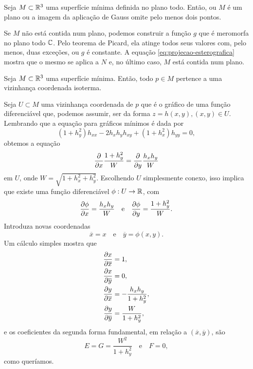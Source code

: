 \begin{corolario}
	Seja $M \subset \mathbb{R}^3$ uma superfície mínima definida no plano todo. Então, ou $M$ é um plano ou a imagem da aplicação de Gauss omite pelo menos dois pontos.
\end{corolario}

\begin{demonstracao}
	Se $M$ não está contida num plano, podemos construir a função $g$ que é meromorfa no plano todo $\mathbb{C}$. Pelo teorema de Picard, ela atinge todos seus valores com, pelo menos, duas exceções, ou $g$ é constante. A equação \eqref{eq:projecao-esterografica} mostra que o mesmo se aplica a $N$ e, no último caso, $M$ está contida num plano.
\end{demonstracao}

\begin{teorema}
	Seja $M \subset \mathbb{R}^3$ uma superfície mínima. Então, todo $p \in M$ pertence a uma vizinhança coordenada isoterma.
\end{teorema}

\begin{demonstracao}
	Seja $U \subset M$ uma vizinhança coordenada de $p$ que é o gráfico de uma função diferenciável que, podemos assumir, ser da forma $z = h(x,y), (x,y) \in U$.
	Lembrando que a equação para gráficos mínimos é dada por
	\begin{equation*}
	(1 + h_y^2) h_{xx} - 2 h_x h_y h_{xy} + (1 + h_x^2) h_{yy} = 0,
	\end{equation*}
	obtemos a equação
	\begin{equation*}
	\frac{\partial}{\partial x} \frac{1 + h_y^2}{W} = \frac{\partial}{\partial y} \frac{h_x h_y}{W}
	\end{equation*}
	em $U$, onde $W = \sqrt{1 + h_x^2 + h_y^2}$. Escolhendo $U$ simplesmente conexo, isso implica que existe uma função diferenciável $\phi: U \rightarrow \mathbb{R}$, com
	\begin{equation*}
	\frac{\partial \phi}{\partial x} = \frac{h_x h_y}{W} \quad \text{e} \quad
	\frac{\partial \phi}{\partial y} = \frac{1 + h_y^2}{W}.
	\end{equation*}
	Introduza novas coordenadas
	\begin{equation*}
	\overline{x} = x \quad \text{e} \quad
	\overline{y} = \phi(x,y).
	\end{equation*}
	Um cálculo simples mostra que
	\begin{align*}
	\frac{\partial x}{\partial \overline{x}} &= 1, \\
	\frac{\partial x}{\partial \overline{y}} &= 0, \\
	\frac{\partial y}{\partial \overline{x}} &= -\frac{h_x h_y}{1 + h_y^2}, \\
	\frac{\partial y}{\partial \overline{y}} &= \frac{W}{1 + h_y^2},
	\end{align*}
	e os coeficientes da segunda forma fundamental, em relação a $(\overline{x}, \overline{y})$, são
	\begin{equation*}
	E = G = \frac{W^2}{1 + h_y^2} \quad \text{e} \quad
	F = 0,
	\end{equation*}
	como queríamos.
\end{demonstracao}

